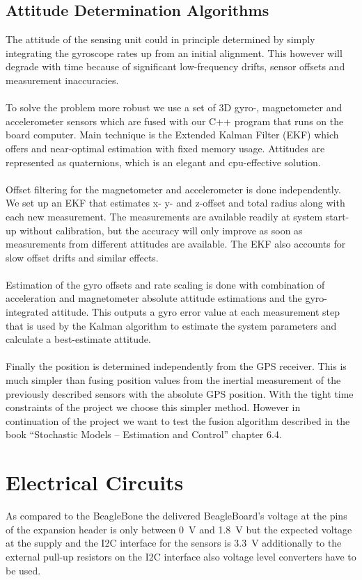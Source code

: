 \subsection{Attitude Determination Algorithms}
The attitude of the sensing unit could in principle determined by simply integrating the gyroscope rates up from an initial alignment. This however will degrade with time because of significant low-frequency drifts, sensor offsets and measurement inaccuracies.
\\
\\
To solve the problem more robust we use a set of 3D gyro-, magnetometer and accelerometer sensors which are fused with our C++ program that runs on the board computer. Main technique is the Extended Kalman Filter (EKF) which offers and near-optimal estimation with fixed memory usage. Attitudes are represented as quaternions, which is an elegant and cpu-effective solution.
\\
\\
Offset filtering for the magnetometer and accelerometer is done independently.
We set up an EKF that estimates x- y- and z-offset and total radius along with each new measurement.
The measurements are available readily at system start-up without calibration, but the accuracy will only improve as soon as measurements from different attitudes are available. The EKF also accounts for slow offset drifts and similar effects.
\\
\\
Estimation of the gyro offsets and rate scaling is done with combination of acceleration and magnetometer absolute attitude estimations and the gyro-integrated attitude. This outputs a gyro error value at each measurement step that is used by the Kalman algorithm to estimate the system parameters and calculate a best-estimate attitude.
\\
\\
Finally the position is determined independently from the GPS receiver. This is much simpler than fusing position values from the inertial measurement of the previously described sensors with the absolute GPS position. With the tight time constraints of the project we choose this simpler method. However in continuation of the project we want to test the fusion algorithm described in the book ``Stochastic Models -- Estimation and Control'' chapter 6.4.

\FloatBarrier
\section{Electrical Circuits}

As compared to the BeagleBone the delivered BeagleBoard's voltage at the pins
of the expansion header is only between 0~V and 1.8~V but the expected voltage
at the supply and the I2C interface for the sensors is 3.3~V additionally to
the external pull-up resistors on the I2C interface also voltage level
converters have to be used.
